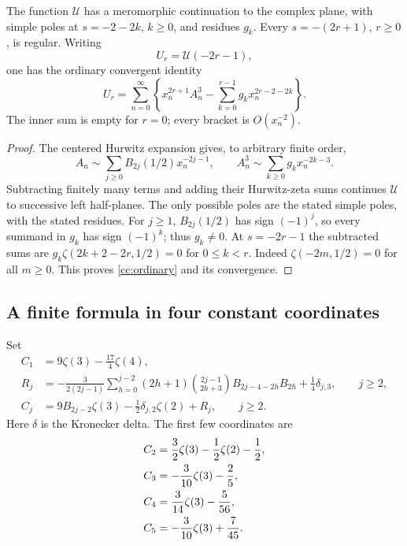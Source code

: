 \begin{proposition}
\label{cc:continuation}
The function $\mathcal U$ has a meromorphic continuation to the complex
plane, with simple poles at $s=-2-2k$, $k\ge0$, and residues $g_k$.
Every $s=-(2r+1)$, $r\ge0$, is regular.  Writing
\begin{equation}\label{cc:Mr}
 U_r=\mathcal U(-2r-1),
\end{equation}
one has the ordinary convergent identity
\begin{equation}\label{cc:ordinary}
 U_r=\sum_{n=0}^{\infty}
 \left\{x_n^{2r+1}A_n^3-
       \sum_{k=0}^{r-1}g_kx_n^{2r-2-2k}\right\}.
\end{equation}
The inner sum is empty for $r=0$; every bracket is $O(x_n^{-2})$.
\end{proposition}

\begin{proof}
The centered Hurwitz expansion gives, to arbitrary finite order,
\[
 A_n\sim\sum_{j\ge0}B_{2j}(1/2)x_n^{-2j-1},\qquad
 A_n^3\sim\sum_{k\ge0}g_kx_n^{-2k-3}.
\]
Subtracting finitely many terms and adding their Hurwitz-zeta sums
continues $\mathcal U$ to successive left half-planes.  The only
possible poles are the stated simple poles, with the stated residues.
For $j\ge1$, $B_{2j}(1/2)$ has sign $(-1)^j$, so every summand
in $g_k$ has sign $(-1)^k$; thus $g_k\ne0$.
At $s=-2r-1$ the subtracted sums are
$g_k\zeta(2k+2-2r,1/2)=0$ for $0\le k<r$.
Indeed $\zeta(-2m,1/2)=0$ for all $m\ge0$.
This proves \eqref{cc:ordinary} and its convergence.
\end{proof}

\subsection{A finite formula in four constant coordinates}

Set
\begin{align}
 C_1&=9\zeta(3)-\frac{17}{4}\zeta(4),
       \label{cc:C1}\\
 R_j&=-\frac{3}{2(2j-1)}
       \sum_{h=0}^{j-2}(2h+1)\binom{2j-1}{2h+3}
          B_{2j-4-2h}B_{2h}
       +\frac14\delta_{j,3},\qquad j\ge2,
       \label{cc:Rj}\\
 C_j&=9B_{2j-2}\zeta(3)-\frac12\delta_{j,2}\zeta(2)+R_j,
       \qquad j\ge2.
       \label{cc:Cj}
\end{align}
Here $\delta$ is the Kronecker delta.  The first few coordinates are
\begin{align}
 C_2&=\frac32\zeta(3)-\frac12\zeta(2)-\frac12,
       \notag\\
 C_3&=-\frac3{10}\zeta(3)-\frac25,
       \notag\\
 C_4&=\frac3{14}\zeta(3)-\frac5{56},
       \notag\\
 C_5&=-\frac3{10}\zeta(3)+\frac7{45}.
       \label{cc:Cexamples}
\end{align}

